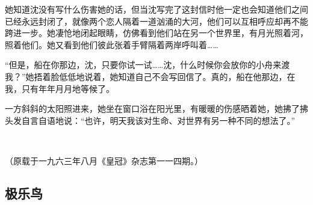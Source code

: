 \par 她知道沈没有写什么伤害她的话，但当沈写完了这封信时他一定也会知道他们之间已经永远封闭了，就像两个恋人隔着一道汹涌的大河，他们可以互相呼应却再不能跨进一步。她凄怆地闭起眼睛，仿佛看到他们站在另一个世界里，有月光照着河，照着他们。她又看到他们彼此张着手臂隔着两岸呼叫着……
\par “但是，船在你那边，沈，只要你试一试……沈，什么时候你会放你的小舟来渡我？”她捂着脸低低地说着，她知道自己不会写回信了。真的，船在他那边，在我，只有年年月月地等候了。
\par 一方斜斜的太阳照进来，她坐在窗口浴在阳光里，有暖暖的伤感晒着她，她拂了拂头发自言自语地说：“也许，明天我该对生命、对世界有另一种不同的想法了。”
\par  
\par （原载于一九六三年八月《皇冠》杂志第一一四期。）





\subsection{极乐鸟}


